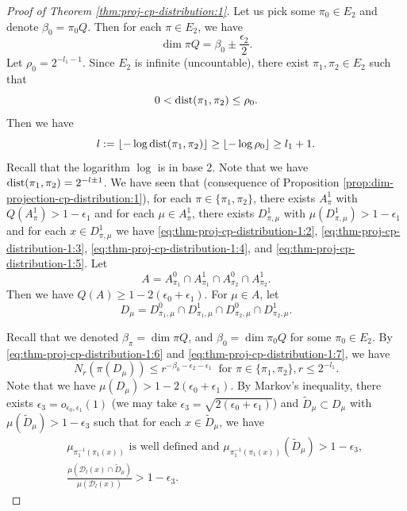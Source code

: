 \documentclass[a4paper,11pt]{amsart}
\theoremstyle{definition}
\numberwithin{equation}{section}
\def\D{\mathcal{D}}
\DeclareMathOperator{\dist}{{\rm dist}}
\begin{document}
\begin{proof}[Proof of Theorem \ref{thm:proj-cp-distribution:1}]
Let us pick some $\pi_0\in E_2$ and denote  $\beta_0=\pi_0 Q$.  Then for each $\pi\in E_2$, we have 
\[
\dim \pi Q = \beta_0\pm \frac{\epsilon_2}{2} .
\]
Let $\rho_0=2^{-l_1-1}$.   
 Since $E_2$ is infinite (uncountable), there exist $\pi_1,\pi_2\in E_2$ such that 
\begin{equation}\label{eq:thm-proj-cp-distribution-1:8}
0<\dist(\pi_1,  \pi_2)\le \rho_0. 
\end{equation}
Then  we have 
\[
l:=\lfloor -\log \dist(\pi_1,\pi_2) \rfloor \ge \lfloor -\log \rho_0 \rfloor \ge l_1+1.
\]
Recall that the logarithm $\log$ is in base 2. Note that we have $\dist (\pi_1,\pi_2)=2^{-l\pm 1}$.  We have seen that (consequence of Proposition \ref{prop:dim-projection-cp-distribution:1}),  for each $\pi\in \{\pi_1,\pi_2\}$, there exists $A_{\pi}^1$ with $Q(A_\pi^1)>1-\epsilon_1$ and for each $\mu\in A_\pi^1$, there exists $D_{\pi,\mu}^1$ with $\mu(D_{\pi,\mu}^1)>1-\epsilon_1$ and for each $x\in D_{\pi,\mu}^1$ we have  \eqref{eq:thm-proj-cp-distribution-1:2},  \eqref{eq:thm-proj-cp-distribution-1:3}, \eqref{eq:thm-proj-cp-distribution-1:4}, and \eqref{eq:thm-proj-cp-distribution-1:5}.
Let 
\[
A=A_{\pi_1}^0 \cap A_{\pi_1}^1 \cap A_{\pi_2}^0 \cap A_{\pi_2}^1. 
\]
Then we have $Q(A)\ge 1-2(\epsilon_0+\epsilon_1)$.   For $\mu\in A$, let 
\[
D_\mu=D_{\pi_1,\mu}^0 \cap D_{\pi_1,\mu}^1 \cap D_{\pi_2,\mu}^0 \cap D_{\pi_2,\mu}^1.
\]

Recall that we denoted $\beta_\pi=\dim \pi Q$,   and   $\beta_0=\dim \pi_0 Q$ for some $\pi_0\in E_2$.  By \eqref{eq:thm-proj-cp-distribution-1:6} and \eqref{eq:thm-proj-cp-distribution-1:7},  we have
\begin{equation}\label{eq:thm-proj-cp-distribution-1:9}
N_{r}(\pi(D_\mu)) \le r^{-\beta_0-\epsilon_2- \epsilon_1} \ \textrm{ for } \pi\in\{\pi_1,\pi_2\},r\le 2^{-l_1}.
\end{equation}
Note that we have  $\mu(D_\mu)>1-2(\epsilon_0+\epsilon_1)$.
By Markov's inequality,  there exists $\epsilon_3=o_{\epsilon_0,\epsilon_1}(1)$ (we may take $\epsilon_3=\sqrt{2(\epsilon_0+\epsilon_1)}$) and $\tilde{D}_\mu\subset D_\mu$ with $\mu(\tilde{D}_\mu)>1-\epsilon_3$ such that for each $x\in \tilde{D}_\mu$,   we have 
\begin{eqnarray}
 & & \mu_{\pi_1^{-1}(\pi_1(x))} \textrm{ is well defined and }   \mu_{\pi_1^{-1}(\pi_1(x))}(\tilde{D}_\mu) >1-\epsilon_3, \label{eq:thm-proj-cp-distribution-1:i}\\
& & \frac{\mu(\D_l(x)\cap \tilde{D}_\mu)}{\mu(\D_l(x))} > 1-\epsilon_3. \label{eq:thm-proj-cp-distribution-1:iii}
\end{eqnarray}


\end{proof}
\end{document}
